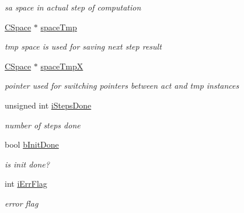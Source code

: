 \begin{DoxyCompactItemize}
\begin{DoxyCompactList}\small\item\em sa space in actual step of computation \item\end{DoxyCompactList}\item 
\hypertarget{classCCellularAutomata_ad47abe7b72446b455913196ef3ad7b55}{
\hyperlink{classCSpace}{CSpace} $\ast$ \hyperlink{classCCellularAutomata_ad47abe7b72446b455913196ef3ad7b55}{spaceTmp}}
\label{classCCellularAutomata_ad47abe7b72446b455913196ef3ad7b55}

\begin{DoxyCompactList}\small\item\em tmp space is used for saving next step result \item\end{DoxyCompactList}\item 
\hypertarget{classCCellularAutomata_af5d63ae730ccbe73cce038562f9a73aa}{
\hyperlink{classCSpace}{CSpace} $\ast$ \hyperlink{classCCellularAutomata_af5d63ae730ccbe73cce038562f9a73aa}{spaceTmpX}}
\label{classCCellularAutomata_af5d63ae730ccbe73cce038562f9a73aa}

\begin{DoxyCompactList}\small\item\em pointer used for switching pointers between act and tmp instances \item\end{DoxyCompactList}\item 
\hypertarget{classCCellularAutomata_ac218781cb45b36af4d7de0ea4676c0f3}{
unsigned int \hyperlink{classCCellularAutomata_ac218781cb45b36af4d7de0ea4676c0f3}{iStepsDone}}
\label{classCCellularAutomata_ac218781cb45b36af4d7de0ea4676c0f3}

\begin{DoxyCompactList}\small\item\em number of steps done \item\end{DoxyCompactList}\item 
\hypertarget{classCCellularAutomata_a14ce0fe077d51a9e7234d9dfc02bda14}{
bool \hyperlink{classCCellularAutomata_a14ce0fe077d51a9e7234d9dfc02bda14}{bInitDone}}
\label{classCCellularAutomata_a14ce0fe077d51a9e7234d9dfc02bda14}

\begin{DoxyCompactList}\small\item\em is init done? \item\end{DoxyCompactList}\item 
\hypertarget{classCCellularAutomata_a3c86a7f73e2c54eb2ee34076948602e9}{
int \hyperlink{classCCellularAutomata_a3c86a7f73e2c54eb2ee34076948602e9}{iErrFlag}}
\label{classCCellularAutomata_a3c86a7f73e2c54eb2ee34076948602e9}

\begin{DoxyCompactList}\small\item\em error flag \item\end{DoxyCompactList}\end{DoxyCompactItemize}


